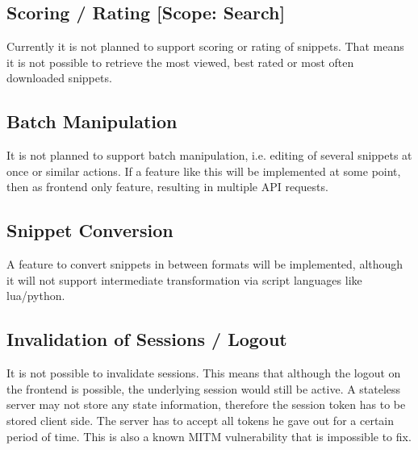 \subsection*{Scoring / Rating \mbox{[}Scope\+: Search\mbox{]}}

Currently it is not planned to support scoring or rating of snippets. That means it is not possible to retrieve the most viewed, best rated or most often downloaded snippets.

\subsection*{Batch Manipulation}

It is not planned to support batch manipulation, i.\+e. editing of several snippets at once or similar actions. If a feature like this will be implemented at some point, then as frontend only feature, resulting in multiple A\+PI requests.

\subsection*{Snippet Conversion}

A feature to convert snippets in between formats will be implemented, although it will not support intermediate transformation via script languages like lua/python.

\subsection*{Invalidation of Sessions / Logout}

It is not possible to invalidate sessions. This means that although the logout on the frontend is possible, the underlying session would still be active. A stateless server may not store any state information, therefore the session token has to be stored client side. The server has to accept all tokens he gave out for a certain period of time. This is also a known M\+I\+TM vulnerability that is impossible to fix. 